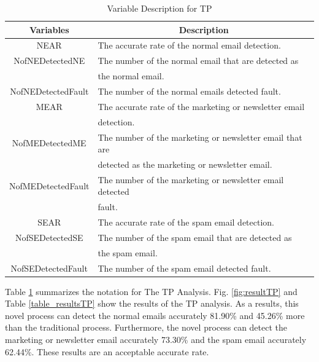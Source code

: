 \documentclass[conference]{IEEEtran}
\begin{document}
\begin{table}[!t]
\renewcommand{\arraystretch}{1.2}
\caption{Variable Description for TP}
\label{table_variableTP}
\centering
\begin{tabular}{c|l}
\hline
\bfseries Variables & \multicolumn{1}{c}{\bfseries Description}\\
\hline
NEAR & The accurate rate of the normal email detection.\\
\hline
NofNEDetectedNE & The number of the normal email that are detected as \\ & the normal email.\\
\hline
NofNEDetectedFault & The number of the normal emails detected fault.\\
\hline
MEAR & The accurate rate of the marketing or newsletter email \\ & detection.\\
\hline
NofMEDetectedME & The number of the marketing or newsletter email that are \\ & detected as the marketing or newsletter email.\\
\hline
NofMEDetectedFault & The number of the marketing or newsletter email detected \\ & fault.\\
\hline
SEAR & The accurate rate of the spam email detection.\\
\hline
NofSEDetectedSE & The number of the spam email that are detected as\\ & the spam email.\\
\hline
NofSEDetectedFault & The number of the spam email detected fault.\\
\hline
\end{tabular}
\end{table}

Table \ref{table_variableTP} summarizes the notation for The TP Analysis.
Fig. \ref{fig:resultTP} and Table \ref{table_resultsTP} show the results of the TP
analysis.
As a
results, this novel process can detect the normal emails accurately 81.90\% and 45.26\% more than the traditional process.
Furthermore, the novel process can detect the marketing or newsletter email accurately 73.30\% and the spam email accurately 62.44\%.
These results are an acceptable accurate
rate.
\end{document}
